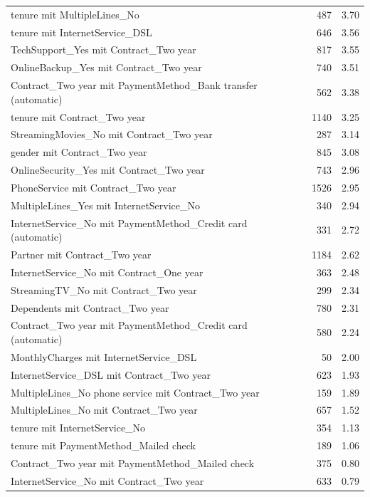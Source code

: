 \documentclass[a4paper,11pt]{article}
\begin{document}
\begin{longtable}{p{9cm}rr}
tenure mit MultipleLines\_No & 487 & 3.70 \\
tenure mit InternetService\_DSL & 646 & 3.56 \\
TechSupport\_Yes mit Contract\_Two year & 817 & 3.55 \\
OnlineBackup\_Yes mit Contract\_Two year & 740 & 3.51 \\
Contract\_Two year mit PaymentMethod\_Bank transfer (automatic) & 562 & 3.38 \\
tenure mit Contract\_Two year & 1140 & 3.25 \\
StreamingMovies\_No mit Contract\_Two year & 287 & 3.14 \\
gender mit Contract\_Two year & 845 & 3.08 \\
OnlineSecurity\_Yes mit Contract\_Two year & 743 & 2.96 \\
PhoneService mit Contract\_Two year & 1526 & 2.95 \\
MultipleLines\_Yes mit InternetService\_No & 340 & 2.94 \\
InternetService\_No mit PaymentMethod\_Credit card (automatic) & 331 & 2.72 \\
Partner mit Contract\_Two year & 1184 & 2.62 \\
InternetService\_No mit Contract\_One year & 363 & 2.48 \\
StreamingTV\_No mit Contract\_Two year & 299 & 2.34 \\
Dependents mit Contract\_Two year & 780 & 2.31 \\
Contract\_Two year mit PaymentMethod\_Credit card (automatic) & 580 & 2.24 \\
MonthlyCharges mit InternetService\_DSL & 50 & 2.00 \\
InternetService\_DSL mit Contract\_Two year & 623 & 1.93 \\
MultipleLines\_No phone service mit Contract\_Two year & 159 & 1.89 \\
MultipleLines\_No mit Contract\_Two year & 657 & 1.52 \\
tenure mit InternetService\_No & 354 & 1.13 \\
tenure mit PaymentMethod\_Mailed check & 189 & 1.06 \\
Contract\_Two year mit PaymentMethod\_Mailed check & 375 & 0.80 \\
InternetService\_No mit Contract\_Two year & 633 & 0.79 \\
\end{longtable}
\end{document}

